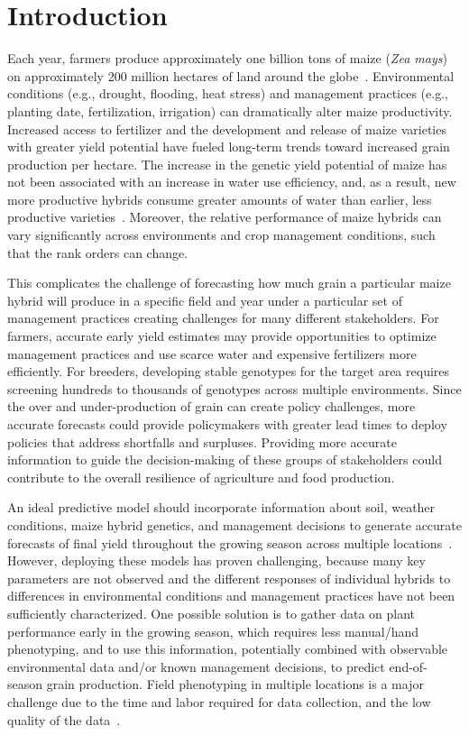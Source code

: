 \documentclass[12pt,twoside]{gsag3jnl}
\begin{document}
\section{Introduction}
Each year, farmers produce approximately one billion tons of maize (\textit{Zea mays}) on approximately 200 million hectares of land around the globe~\citep{erenstein2022global}. Environmental conditions (e.g., drought, flooding, heat stress) and management practices (e.g., planting date, fertilization, irrigation) can dramatically alter maize productivity. Increased access to fertilizer and the development and release of maize varieties with greater yield potential have fueled long-term trends toward increased grain production per hectare. The increase in the genetic yield potential of maize has not been associated with an increase in water use efficiency, and, as a result, new more productive hybrids consume greater amounts of water than earlier, less productive varieties~\citep{ort2014limits, lobell2014greater, lobell2020changes}. Moreover, the relative performance of maize hybrids can vary significantly across environments and crop management conditions, such that the rank orders can change.

This complicates the challenge of forecasting how much grain a particular maize hybrid will produce in a specific field and year under a particular set of management practices creating challenges for many different stakeholders. For farmers, accurate early yield estimates may provide opportunities to optimize management practices and use scarce water and expensive fertilizers more efficiently. For breeders, developing stable genotypes for the target area requires screening hundreds to thousands of genotypes across multiple environments. Since the over and under-production of grain can create policy challenges, more accurate forecasts could provide policymakers with greater lead times to deploy policies that address shortfalls and surpluses. Providing more accurate information to guide the decision-making of these groups of stakeholders could contribute to the overall resilience of agriculture and food production. 

An ideal predictive model should incorporate information about soil, weather conditions, maize hybrid genetics, and management decisions to generate accurate forecasts of final yield throughout the growing season across multiple locations~\citep{peng2020towards}. However, deploying these models has proven challenging, because many key parameters are not observed and the different responses of individual hybrids to differences in environmental conditions and management practices have not been sufficiently characterized. One possible solution is to gather data on plant performance early in the growing season, which requires less manual/hand phenotyping, and to use this information, potentially combined with observable environmental data and/or known management decisions, to predict end-of-season grain production. Field phenotyping in multiple locations is a major challenge due to the time and labor required for data collection, and the low quality of the data~\citep{morisse2022european}.
\end{document}

